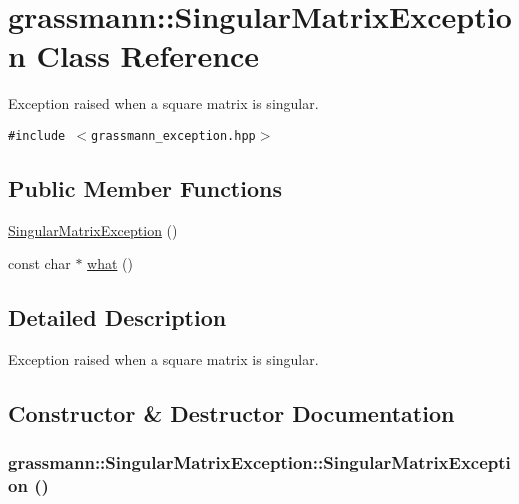 \hypertarget{classgrassmann_1_1SingularMatrixException}{
\section{grassmann::SingularMatrixException Class Reference}
\label{classgrassmann_1_1SingularMatrixException}
}
Exception raised when a square matrix is singular.  


{\tt \#include $<$grassmann\_\-exception.hpp$>$}

\subsection*{Public Member Functions}
\begin{CompactItemize}
\item 
\hyperlink{classgrassmann_1_1SingularMatrixException_26ba77e872ef3c178f2bdb4cdeab767e}{SingularMatrixException} ()
\item 
const char $\ast$ \hyperlink{classgrassmann_1_1SingularMatrixException_21f4b39796e44892284b714e1a631fd1}{what} ()
\end{CompactItemize}


\subsection{Detailed Description}
Exception raised when a square matrix is singular. 

\subsection{Constructor \& Destructor Documentation}
\hypertarget{classgrassmann_1_1SingularMatrixException_26ba77e872ef3c178f2bdb4cdeab767e}{
\subsubsection[SingularMatrixException]{\setlength{\rightskip}{0pt plus 5cm}grassmann::SingularMatrixException::SingularMatrixException ()}}
\label{classgrassmann_1_1SingularMatrixException_26ba77e872ef3c178f2bdb4cdeab767e}




